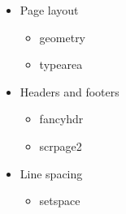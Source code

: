 \documentclass{article}
\begin{document}
\begin{itemize}
  \item Page layout
  \begin{itemize}
    \item geometry
    \item typearea
  \end{itemize}
  \item Headers and footers
  \begin{itemize}
    \item fancyhdr
    \item scrpage2
  \end{itemize}
  \item Line spacing
  \begin{itemize}
    \item setspace
  \end{itemize}
\end{itemize}
\end{document}
